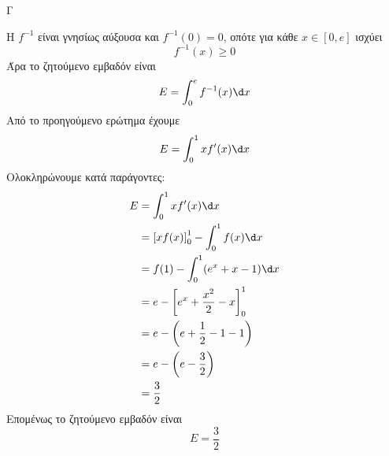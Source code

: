 \begin{thema}{Γ}
\begin{erwthma}
\item Η $f^{-1}$ είναι γνησίως αύξουσα και $f^{-1}(0)=0$, οπότε για κάθε $x\in[0,e]$ ισχύει
\[f^{-1}(x)\geq 0\]
Άρα το ζητούμενο εμβαδόν είναι
\[E=\dint_0^e f^{-1}(x)\d x\]
Από το προηγούμενο ερώτημα έχουμε
\[E=\dint_0^1 x f'(x)\d x\]
Ολοκληρώνουμε κατά παράγοντες:
\begin{align*}
E&=\dint_0^1 x f'(x)\d x\\
&=\left[xf(x)\right]_0^1-\dint_0^1 f(x)\d x\\
&=f(1)-\dint_0^1(e^x+x-1)\d x\\
&=e-\left[e^x+\frac{x^2}{2}-x\right]_0^1\\
&=e-\left(e+\frac{1}{2}-1-1\right)\\
&=e-\left(e-\frac{3}{2}\right)\\
&=\frac{3}{2}
\end{align*}
Επομένως το ζητούμενο εμβαδόν είναι
\[E=\frac{3}{2}\]
\end{erwthma}
\end{thema}

